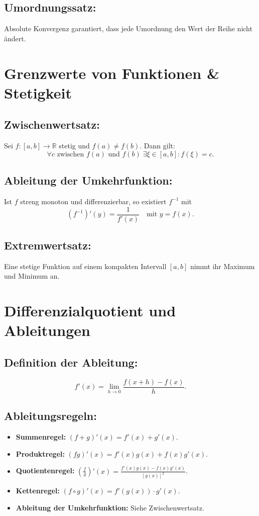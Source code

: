 \documentclass[12pt]{article}
\begin{document}
\subsection*{Umordnungssatz:}
Absolute Konvergenz garantiert, dass jede Umordnung den Wert der Reihe nicht ändert.

\section{Grenzwerte von Funktionen \& Stetigkeit}
\subsection*{Zwischenwertsatz:}
Sei \( f:[a,b] \to \mathbb{R} \) stetig und \( f(a) \neq f(b) \). Dann gilt:
\[
\forall c \text{ zwischen } f(a) \text{ und } f(b) \; \exists \xi \in [a,b] : f(\xi) = c.
\]
\subsection*{Ableitung der Umkehrfunktion:}
Ist \( f \) streng monoton und differenzierbar, so existiert \( f^{-1} \) mit
\[
(f^{-1})'(y) = \frac{1}{f'(x)} \quad \text{mit } y=f(x).
\]
\subsection*{Extremwertsatz:}
Eine stetige Funktion auf einem kompakten Intervall \( [a,b] \) nimmt ihr Maximum und Minimum an.

\section{Differenzialquotient und Ableitungen}
\subsection*{Definition der Ableitung:}
\[
f'(x) = \lim_{h \to 0} \frac{f(x+h)-f(x)}{h}.
\]
\subsection*{Ableitungsregeln:}
\begin{itemize}
  \item \textbf{Summenregel:} \( (f+g)'(x) = f'(x) + g'(x) \).
  \item \textbf{Produktregel:} \( (fg)'(x) = f'(x)g(x) + f(x)g'(x) \).
  \item \textbf{Quotientenregel:} \( \left(\frac{f}{g}\right)'(x) = \frac{f'(x)g(x)-f(x)g'(x)}{[g(x)]^2} \).
  \item \textbf{Kettenregel:} \( (f\circ g)'(x) = f'(g(x)) \cdot g'(x) \).
  \item \textbf{Ableitung der Umkehrfunktion:} Siehe Zwischenwertsatz.
\end{itemize}
\end{document}
